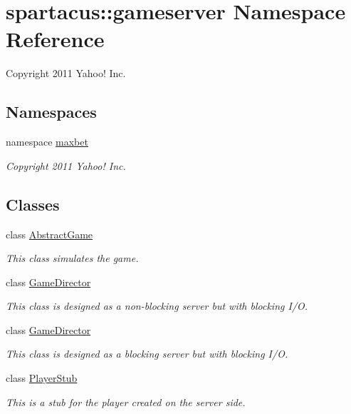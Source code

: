 \hypertarget{namespacespartacus_1_1gameserver}{
\section{\-s\-p\-a\-r\-t\-a\-c\-u\-s\-:\-:\-g\-a\-m\-e\-s\-e\-r\-v\-e\-r \-N\-a\-m\-e\-s\-p\-a\-c\-e \-R\-e\-f\-e\-r\-e\-n\-c\-e}
\label{namespacespartacus_1_1gameserver}
}


Copyright 2011 Yahoo! Inc.  


\subsection*{Namespaces}
\begin{DoxyCompactItemize}
\item 
\-n\-a\-m\-e\-s\-p\-a\-ce \hyperlink{namespacespartacus_1_1gameserver_1_1maxbet}{\-m\-a\-x\-b\-e\-t}
\begin{DoxyCompactList}\small\item\em Copyright 2011 Yahoo! Inc. \end{DoxyCompactList}\end{DoxyCompactItemize}
\subsection*{Classes}
\begin{DoxyCompactItemize}
\item 
class \hyperlink{classspartacus_1_1gameserver_1_1AbstractGame}{\-A\-b\-s\-t\-r\-a\-c\-t\-G\-a\-m\-e}
\begin{DoxyCompactList}\small\item\em This class simulates the game. \end{DoxyCompactList}\item 
class \hyperlink{classspartacus_1_1gameserver_1_1GameDirector}{\-G\-a\-m\-e\-D\-i\-r\-e\-c\-t\-o\-r}
\begin{DoxyCompactList}\small\item\em This class is designed as a non-\/blocking server but with blocking I/O. \end{DoxyCompactList}\item 
class \hyperlink{classspartacus_1_1gameserver_1_1GameDirector2}{\-G\-a\-m\-e\-D\-i\-r\-e\-c\-t\-o\-r}
\begin{DoxyCompactList}\small\item\em This class is designed as a blocking server but with blocking I/O. \end{DoxyCompactList}\item 
class \hyperlink{classspartacus_1_1gameserver_1_1PlayerStub}{\-P\-l\-a\-y\-e\-r\-S\-t\-u\-b}
\begin{DoxyCompactList}\small\item\em This is a stub for the player created on the server side. \end{DoxyCompactList}\end{DoxyCompactItemize}


